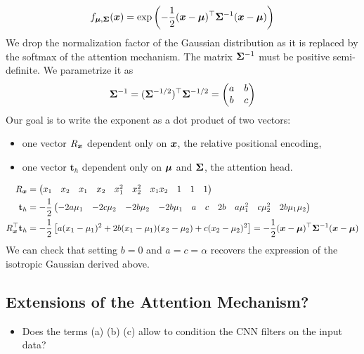 \documentclass{article} %
\begin{document}
\begin{align}
  f_{{\bm{\mu}}, {\bm{\Sigma}}}({\bm{x}}) = \exp \left(
    - \frac 1 2
    ({\bm{x}} - {\bm{\mu}})^\top {\bm{\Sigma}}^{-1} ({\bm{x}} - {\bm{\mu}})
  \right)
\end{align}
We drop the normalization factor of the Gaussian distribution as it is replaced by the softmax of the attention mechanism.
The matrix ${\bm{\Sigma}}^{-1}$ must be positive semi-definite.
We parametrize it as 
\begin{align}
  {\bm{\Sigma}}^{-1} = ({\bm{\Sigma}}^{-1/2})^\top{\bm{\Sigma}}^{-1/2} = \begin{pmatrix}a & b \\ b & c\end{pmatrix}  
\end{align}
Our goal is to write the exponent as a dot product of two vectors:
\begin{itemize}
  \item one vector $R_{\bm{x}}$ dependent only on ${\bm{x}}$, the relative positional encoding,
  \item one vector $\mathbf{t}_h$ dependent only on ${\bm{\mu}}$ and ${\bm{\Sigma}}$, the attention head.
\end{itemize}
\begin{align}
  R_{\bm{x}} &= 
  \begin{pmatrix}
    x_1      & x_2       & x_1      & x_2      & x_1^2   & x_2^2 & x_1 x_2 & 1        & 1         & 1
  \end{pmatrix}\\
  \mathbf{t}_h &= -\frac{1}{2}
  \begin{pmatrix}
    -2a\mu_1 & -2c \mu_2 & -2b\mu_2 & -2b\mu_1 & a       & c     & 2b      & a\mu_1^2 & c\mu_2^2 & 2b\mu_1 \mu_2
  \end{pmatrix}\\
  R_{\bm{x}}^\top \mathbf{t}_h &=
  -\frac{1}{2} 
  \left[
  a(x_1 - \mu_1)^2 + 2b(x_1-\mu_1)(x_2 -\mu_2) + c(x_2-\mu_2)^2 
  \right]
  = - \frac 1 2 ({\bm{x}} - {\bm{\mu}})^\top {\bm{\Sigma}}^{-1} ({\bm{x}} - {\bm{\mu}})
\end{align}
We can check that setting $b = 0$ and $a=c=\alpha$ recovers the expression of the isotropic Gaussian derived above.


\subsection{Extensions of the Attention Mechanism?} 
\begin{itemize}

  \item Does the terms (a) (b) (c) allow to condition the CNN filters on the input data?
\end{itemize}
\end{document}

